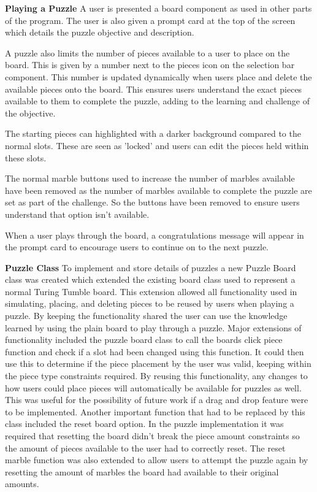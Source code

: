 \documentclass{l4proj}
\begin{document}
\textbf{Playing a Puzzle}
A user is presented a board component as used in other parts of the program. The user is also given a prompt card at the top of the screen which details the puzzle objective and description. 

A puzzle also limits the number of pieces available to a user to place on the board. This is given by a number next to the pieces icon on the selection bar component. This number is updated dynamically when users place and delete the available pieces onto the board. This ensures users understand the exact pieces available to them to complete the puzzle, adding to the learning and challenge of the objective. 

The starting pieces can highlighted with a darker background compared to the normal slots. These are seen as 'locked' and users can edit the pieces held within these slots. 

The normal marble buttons used to increase the number of marbles available have been removed as the number of marbles available to complete the puzzle are set as part of the challenge. So the buttons have been removed to ensure users understand that option isn't available. 

When a user plays through the board, a congratulations message will appear in the prompt card to encourage users to continue on to the next puzzle.

\textbf{Puzzle Class}
To implement and store details of puzzles a new Puzzle Board class was created which extended the existing board class used to represent a normal Turing Tumble board. This extension allowed all functionality used in simulating, placing, and deleting pieces to be reused by users when playing a puzzle. By keeping the functionality shared the user can use the knowledge learned by using the plain board to play through a puzzle. Major extensions of functionality included the puzzle board class to call the boards click piece function and check if a slot had been changed using this function. It could then use this to determine if the piece placement by the user was valid, keeping within the piece type constraints required. By reusing this functionality, any changes to how users could place pieces will automatically be available for puzzles as well. This was useful for the possibility of future work if a drag and drop feature were to be implemented. Another important function that had to be replaced by this class included the reset board option. In the puzzle implementation it was required that resetting the board didn't break the piece amount constraints so the amount of pieces available to the user had to correctly reset. The reset marble function was also extended to allow users to attempt the puzzle again by resetting the amount of marbles the board had available to their original amounts. 
\end{document}
